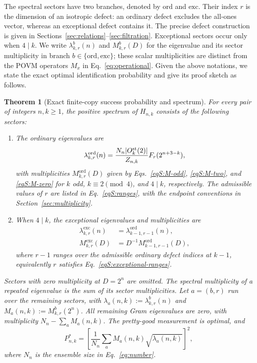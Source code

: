 \documentclass[journal,twocolumn]{IEEEtran}
\newtheorem{theorem}{Theorem}
\theoremstyle{definition}
\theoremstyle{plain}
\newcommand{\Ord}{\mathrm{ord}}
\newcommand{\Exc}{\mathrm{exc}}
\begin{document}
The spectral sectors have two branches, denoted by $\Ord$ and $\Exc$.
Their index $r$ is the dimension of an isotropic defect: an ordinary
defect excludes the all-ones vector, whereas an exceptional defect
contains it.  The precise defect construction is given in
Sections~\ref{sec:relations}--\ref{sec:filtration}.  Exceptional sectors
occur only when $4\mid k$.  We write $\lambda^b_{k,r}(n)$ and
$M^b_{k,r}(D)$ for the eigenvalue and its sector multiplicity in branch
$b\in\{\Ord,\Exc\}$; these scalar multiplicities are distinct from the
POVM operators $M_x$ in Eq.~\eqref{eq:operational}. Given the above notations, we state the exact optimal identification probability and give its proof sketch as follows.

\begin{theorem}[Exact finite-copy success probability and spectrum]
\label{thmS:finite-spectrum}
For every pair of integers $n,k\geq1$, the positive spectrum of $H_{n,k}$
consists of the following sectors:
\begin{enumerate}
\item The ordinary eigenvalues are
      \begin{equation}
       \lambda^{\Ord}_{k,r}(n)
       =\frac{N_n|O_k^{\rm st}(2)|}{Z_{n,k}}F_r(2^{n+3-k}),
       \label{eq:main-ordinary-eigenvalue}
      \end{equation}
      with multiplicities $M^{\Ord}_{k,r}(D)$ given by
      Eqs.~\eqref{eqS:M-odd}, \eqref{eqS:M-two}, and \eqref{eqS:M-zero}
      for $k$ odd, $k\equiv2\pmod4$, and $4\mid k$, respectively.
      The admissible values of $r$ are listed in Eq.~\eqref{eqS:ranges},
      with the endpoint conventions in Section~\ref{sec:multiplicity}.
\item When $4\mid k$, the exceptional eigenvalues and multiplicities are
      \begin{equation}
       \begin{aligned}
        \lambda^{\Exc}_{k,r}(n)&=\lambda^{\Ord}_{k-1,r-1}(n),\\
        M^{\Exc}_{k,r}(D)&=D^{-1}M^{\Ord}_{k-1,r-1}(D),
       \end{aligned}
       \label{eq:main-exceptional-spectrum}
      \end{equation}
      where $r-1$ ranges over the admissible ordinary defect indices at $k-1$,
      equivalently $r$ satisfies Eq.~\eqref{eqS:exceptional-ranges}.
\end{enumerate}
Sectors with zero multiplicity at $D=2^n$ are omitted.  The spectral
multiplicity of a repeated eigenvalue is the sum of its sector
multiplicities.  Let $a=(b,r)$ run over the
remaining sectors, with $\lambda_a(n,k):=\lambda^b_{k,r}(n)$ and
$M_a(n,k):=M^b_{k,r}(2^n)$.  All remaining Gram eigenvalues are zero,
with multiplicity $N_n-\sum_a M_a(n,k)$.
The pretty-good measurement is optimal, and
\begin{equation}
 P^*_{n,k}
 =\left[\frac1{N_n}\sum_aM_a(n,k)\sqrt{\lambda_a(n,k)}\right]^2,
 \label{eqS:finite-success}
\end{equation}
where $N_n$ is the ensemble size in Eq.~\eqref{eq:number}.
\end{theorem}
\end{document}
